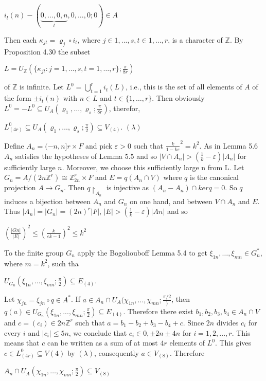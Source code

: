 \documentclass[12pt]{article}
\begin{document}
    $i_l (n) - (\underbrace{0, \dots, 0, n}_t, 0, \dots, 0; 0) \in A$


    Then each $κ_{jt} = \varrho_j \circ i_t$, where $j \in {1, . . . , s}, t \in {1, . . . , r}$, is a character of $\mathbb{Z}$. By Proposition 4.30 the subset


    $L = U_{\mathbb{Z}} (\{\kappa_{jt} : j = 1, \dots, s, t=1, \dots, r\}; \frac{\pi}{8r})$


of $\mathbb{Z}$ is infinite. Let $L^0 = \bigcup^r_{t=1} i_t (L)$, i.e., this is the set of all elements of $A$ of the form $\pm i_t (n)$ with $n \in L$ and 
$t \in \{1, \dots, r\}$. Then obviously $L^0 = -L^0 \subseteq U_A (\varrho_1, \dots, \varrho_s; \frac{\pi}{8r})$, therefor,


    $L^0_{(4r)} \subseteq U_A (\varrho_1, \dots, \varrho_s; \frac{\pi}{2}) \subseteq V_{(4)}$.  $(\lambda)$


    
    Define $A_n = (-n, n]r \times F$ and pick $\varepsilon > 0$ such that $\frac{k}{1-k\varepsilon}^2= k^2$. As in Lemma 5.6 $A_n$ satisfies the
hypotheses of Lemma 5.5 and so $|V \cap A_n| > (\frac{1}{k} - \varepsilon)|A_n|$ for sufficiently large $n$. Moreover, we choose this
sufficiently large n from L. Let $G_n = A/(2n \mathbb{Z}^r) \cong \mathbb{Z}^r_{2n} \times F$ and $E = q(A_n \cap V )$ where $q$ is the canonical
projection $A \to G_n$. Then $q \upharpoonright_{A_n}$ is injective as $(A_n - A_n) \cap ker q = 0$. So $q$ induces a bijection between $A_n$ and
$G_n$ on one hand, and between $V \cap A_n$ and $E$. Thus $|A_n| = |G_n| = (2n)^r |F|$, $|E| > (\frac{1}{k} - \varepsilon)|An|$ and so


    $(\frac{|Gn|}{|E|})^2 \leq (\frac{k}{\varepsilon k - 1})^2 \leq k^2$


    
    To the finite group $G_n$ apply the Bogoliouboff Lemma 5.4 to get $\xi_{1n}, \dots , \xi_{mn} \in G^*_n$, where $m = k^2$, such tha


    $U_{G_n} (\xi_{1n}, \dots, \xi_{mn}; \frac{\pi}{2}) \subseteq E_{(4)}$.

    
Let $\chi_{jn} = \xi_{jn} \circ q \in A^*$. If $a \in A_n \cap U_A(\chi_{1n}, . . . , \chi_{mn}; \frac{\pi/2})$, then $q(a) \in U_{G_n}(\xi_{1n}, . . . , \xi_{mn}; \frac{\pi}{2}) \subseteq E_{(4)}$. Therefore
there exist $b_1, b_2, b_3, b_4 \in A_n \cap V$ and $c = (c_i) \in 2n\mathbb{Z}^r$ such that $a = b_1 - b_2 + b_3 - b_4 + c$. Since $2n$ divides $c_i$ for
every $i$ and $|c_i| \leq 5n$, we conclude that $c_i \in {0, \pm 2n \pm 4n}$ for $i = 1, 2, . . . , r$. This means that $c$ can be written
as a sum of at most $4r$ elements of $L^0$. This gives $c ∈ L^0_{(4r)} \subseteq V(4)$ by $(\lambda)$, consequently $a \in V_{(8)}$. Therefore


    $A_n \cap U_A (\chi_{1n}, \dots, \chi_{mn}; \frac{\pi}{2}) \subseteq V_{(8)}$
\end{document}
